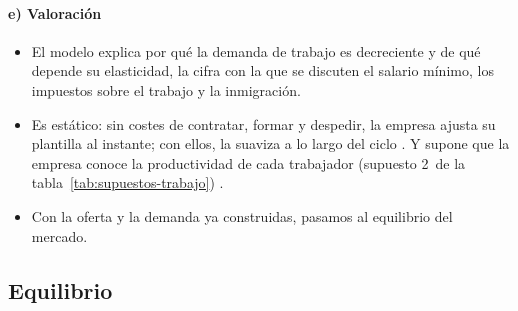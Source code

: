 \documentclass[11pt]{article}
\begin{document}
\paragraph{e) Valoración}

\begin{itemize}
\item El modelo explica por qué la demanda de trabajo es decreciente y de qué depende su elasticidad, la cifra con la que se discuten el salario mínimo, los impuestos sobre el trabajo y la inmigración.
\item Es estático: sin costes de contratar, formar y despedir, la empresa ajusta su plantilla al instante; con ellos, la suaviza a lo largo del ciclo . Y supone que la empresa conoce la productividad de cada trabajador (supuesto 2~de la tabla~\ref{tab:supuestos-trabajo}) .
\item Con la oferta y la demanda ya construidas, pasamos al equilibrio del mercado.
\end{itemize}

\subsection{Equilibrio}\label{sec:equilibrio}
\end{document}
